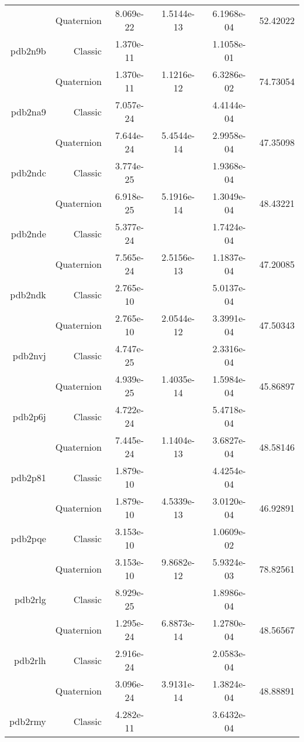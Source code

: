 \begin{xltabular}{\textwidth}{r|rS[table-format=1.3e+2]S[table-format=1.4e+2]S[table-format=1.4e+2]S[table-format=-1.5]}
& Quaternion & 8.069e-22 & 1.5144e-13 & 6.1968e-04 & 52.42022\\  \addlinespace
pdb2n9b & Classic & 1.370e-11 &  & 1.1058e-01 & \\
& Quaternion & 1.370e-11 & 1.1216e-12 & 6.3286e-02 & 74.73054\\  \addlinespace
pdb2na9 & Classic & 7.057e-24 &  & 4.4144e-04 & \\
& Quaternion & 7.644e-24 & 5.4544e-14 & 2.9958e-04 & 47.35098\\  \addlinespace
pdb2ndc & Classic & 3.774e-25 &  & 1.9368e-04 & \\
& Quaternion & 6.918e-25 & 5.1916e-14 & 1.3049e-04 & 48.43221\\  \addlinespace
pdb2nde & Classic & 5.377e-24 &  & 1.7424e-04 & \\
& Quaternion & 7.565e-24 & 2.5156e-13 & 1.1837e-04 & 47.20085\\  \addlinespace
pdb2ndk & Classic & 2.765e-10 &  & 5.0137e-04 & \\
& Quaternion & 2.765e-10 & 2.0544e-12 & 3.3991e-04 & 47.50343\\  \addlinespace
pdb2nvj & Classic & 4.747e-25 &  & 2.3316e-04 & \\
& Quaternion & 4.939e-25 & 1.4035e-14 & 1.5984e-04 & 45.86897\\  \addlinespace
pdb2p6j & Classic & 4.722e-24 &  & 5.4718e-04 & \\
& Quaternion & 7.445e-24 & 1.1404e-13 & 3.6827e-04 & 48.58146\\  \addlinespace
pdb2p81 & Classic & 1.879e-10 &  & 4.4254e-04 & \\
& Quaternion & 1.879e-10 & 4.5339e-13 & 3.0120e-04 & 46.92891\\  \addlinespace
pdb2pqe & Classic & 3.153e-10 &  & 1.0609e-02 & \\
& Quaternion & 3.153e-10 & 9.8682e-12 & 5.9324e-03 & 78.82561\\  \addlinespace
pdb2rlg & Classic & 8.929e-25 &  & 1.8986e-04 & \\
& Quaternion & 1.295e-24 & 6.8873e-14 & 1.2780e-04 & 48.56567\\  \addlinespace
pdb2rlh & Classic & 2.916e-24 &  & 2.0583e-04 & \\
& Quaternion & 3.096e-24 & 3.9131e-14 & 1.3824e-04 & 48.88891\\  \addlinespace
pdb2rmy & Classic & 4.282e-11 &  & 3.6432e-04 & \\

\end{xltabular}
